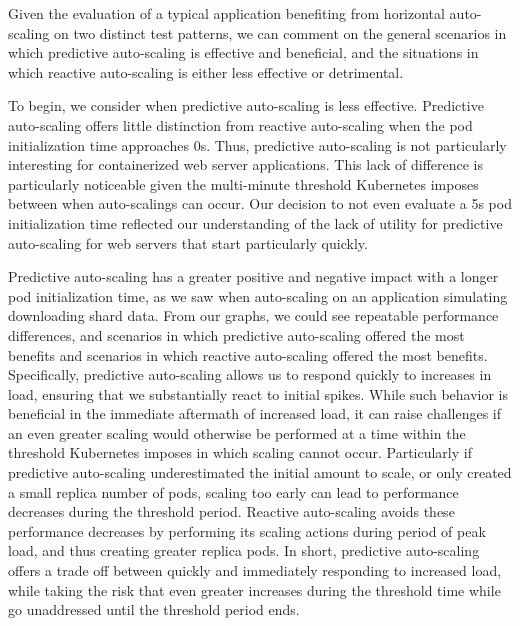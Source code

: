 Given the evaluation of a typical application benefiting from horizontal
auto-scaling on two distinct test patterns, we can comment on the general
scenarios in which predictive auto-scaling is effective and beneficial, and the
situations in which reactive auto-scaling is either less effective or
detrimental.

To begin, we consider when predictive auto-scaling is less
effective. Predictive auto-scaling offers little distinction from reactive
auto-scaling when the pod initialization time approaches 0s. Thus, predictive
auto-scaling is not particularly interesting for containerized web server
applications. This lack of difference is particularly noticeable given the
multi-minute threshold Kubernetes imposes between when auto-scalings can occur.
Our decision to not even evaluate a 5s pod initialization time reflected our
understanding of the lack of utility for predictive auto-scaling for web servers
that start particularly quickly.

Predictive auto-scaling has a greater positive and negative impact
with a longer pod initialization time, as we saw when auto-scaling on an
application simulating downloading shard data. From our graphs, we could see
repeatable performance differences, and scenarios in which predictive
auto-scaling offered the most benefits and scenarios in which reactive
auto-scaling offered the most benefits. Specifically, predictive auto-scaling
allows us to respond quickly to increases in load, ensuring that we
substantially react to initial spikes. While such behavior is beneficial in the
immediate aftermath of increased load, it can raise challenges if an even
greater scaling would otherwise be performed at a time within the
threshold Kubernetes imposes in
which scaling cannot occur. Particularly if predictive auto-scaling
underestimated the initial amount to scale, or only created a small replica
number of pods, scaling too early can lead to
performance decreases during the threshold period. Reactive auto-scaling avoids
these performance decreases by performing its scaling actions during period of
peak load, and thus creating greater replica pods. In short, predictive
auto-scaling offers a trade off between quickly and immediately responding to
increased load, while taking the risk that even greater increases during the
threshold time while go unaddressed until the threshold period ends.

